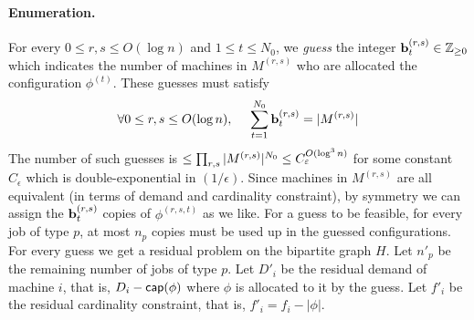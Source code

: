 \paragraph{Enumeration.} 
For every $0\leq r,s \leq O(\log n)$ and $1\le t\le N_0$, we {\em guess}  the  integer $\mathbf{b}^{(r,s)}_t \in {\mathbb Z}_{\geq 0}$ which indicates the number of machines in $M^{(r,s)}$ who are allocated the configuration $\phi^{(t)}$.
These guesses must satisfy 
\begin{equation}\label{eq:milp1}
\forall 0\leq r,s \leq O(\log n), ~~~~ \sum_{t=1}^{N_0} \mathbf{b}^{(r,s)}_t = |M^{(r,s)}|
\end{equation}
The number of such guesses is $\leq \prod_{r,s} |M^{(r,s)}|^{N_0} \leq C_\varepsilon^{O(\log^3 n)}$ for some constant $C_\epsilon$ which is double-exponential in $(1/\epsilon)$.
Since machines in $M^{(r,s)}$ are all equivalent (in terms of demand and cardinality constraint), by symmetry we can assign the $\mathbf{b}^{(r,s)}_t$ copies of $\phi^{(r,s,t)}$ as we like.
For a guess to be feasible, for every job of type $p$, at most $n_p$ copies must be used up in the guessed configurations.
For every guess we get a residual problem on the bipartite graph $H$.
Let $n'_p$ be the remaining number of jobs of type $p$. 
Let $D'_i$ be the residual demand of machine $i$, that is, $D_i - \mathsf{cap}(\phi)$ where $\phi$ is allocated to it by the guess.
Let $f'_i$ be the residual cardinality constraint, that is, $f'_i = f_i - |\phi|$.
